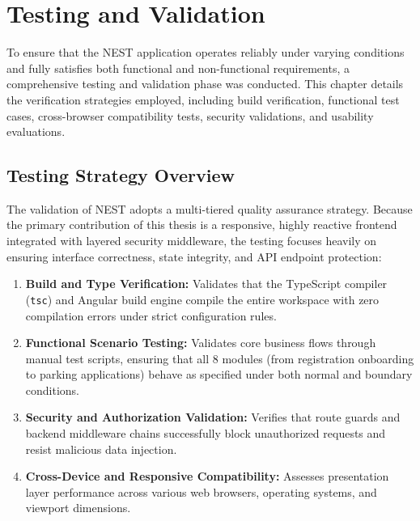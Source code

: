 \chapter{Testing and Validation}
\label{chap:testing-validation}

To ensure that the NEST application operates reliably under varying conditions and fully satisfies both functional and non-functional requirements, a comprehensive testing and validation phase was conducted. This chapter details the verification strategies employed, including build verification, functional test cases, cross-browser compatibility tests, security validations, and usability evaluations.

\section{Testing Strategy Overview}
The validation of NEST adopts a multi-tiered quality assurance strategy. Because the primary contribution of this thesis is a responsive, highly reactive frontend integrated with layered security middleware, the testing focuses heavily on ensuring interface correctness, state integrity, and API endpoint protection:
\begin{enumerate}
    \item \textbf{Build and Type Verification:} Validates that the TypeScript compiler (\texttt{tsc}) and Angular build engine compile the entire workspace with zero compilation errors under strict configuration rules.
    \item \textbf{Functional Scenario Testing:} Validates core business flows through manual test scripts, ensuring that all 8 modules (from registration onboarding to parking applications) behave as specified under both normal and boundary conditions.
    \item \textbf{Security and Authorization Validation:} Verifies that route guards and backend middleware chains successfully block unauthorized requests and resist malicious data injection.
    \item \textbf{Cross-Device and Responsive Compatibility:} Assesses presentation layer performance across various web browsers, operating systems, and viewport dimensions.
\end{enumerate}

